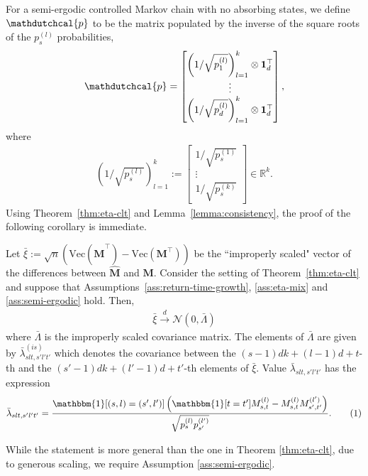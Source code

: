 \documentclass[twoside,11pt]{article}
\newcommand{\pow}[1]{^{(#1)}}%
\renewcommand{\Vec}[1]{\text{Vec}\lp #1\rp}
\numberwithin{equation}{section}
\newcommand{\lp}{\left(}
\newcommand{\rp}{\right)}
\newcommand{\Ncal}{\mathcal{N}}
\newcommand{\pcal}{\mathdutchcal{p}}
\newcommand\numberthis{\addtocounter{equation}{1}\tag{\theequation}}
\newcommand{\indicator}{\mathbbm{1}}
\begin{document}
For a semi-ergodic controlled Markov chain with no absorbing states, we define $\pcal$ to be the matrix populated by the inverse of the square roots of the $p_s\pow l$ probabilities, 
\begin{align*}
\pcal = 
\begin{bmatrix}
     \lp1/\sqrt{p_1\pow l}\rp_{l=1}^k \otimes \mathbf{1}_d^\top\\
     \vdots\\
    \lp1/\sqrt{p_d\pow l}\rp_{l=1}^k \otimes \mathbf{1}_d^\top 
\end{bmatrix}
, 
\end{align*}
where
\begin{align*}
     \lp1/\sqrt{p_s\pow l}\rp_{l=1}^k :=
\begin{bmatrix}
     1/\sqrt{p_s\pow 1}\\
     \vdots\\
    1/\sqrt{p_s\pow k}
\end{bmatrix} 
\in \mathbb R^k.
\end{align*}
Using Theorem~\ref{thm:eta-clt} and Lemma~\ref{lemma:consistency}, the proof of the following corollary is immediate.
\begin{corollary}\label{cor:improper-clt}
    Let $\bar \xi :=\sqrt{n}\lp\Vec{\mathbf{\hat M}^\top}-\Vec{\mathbf{M}^\top}\rp$ be the ``improperly scaled" vector of the differences between $\mathbf{\hat M}$ and $\mathbf{M}$. 
    Consider the setting of Theorem~\ref{thm:eta-clt} and suppose that Assumptions~\ref{ass:return-time-growth}, \ref{ass:eta-mix} and \ref{ass:semi-ergodic} hold. 
    Then,  
    \begin{align*}
    \bar \xi\overset{d}{\rightarrow}\Ncal(0,\bar{\Lambda})
    \end{align*}
    where $\bar{\Lambda}$ is the improperly scaled covariance matrix. The elements of $\bar{\Lambda}$ are given by $\bar{\lambda}_{slt,s'l't'}\pow{is}$ which denotes the covariance between the $(s-1)dk+(l-1)d+t$-th and the $(s'-1)dk+(l'-1)d+t'$-th elements of $\bar \xi$.
    Value $\bar{\lambda}_{slt,s'l't'}$ has the expression
    \begin{align*}
    \bar{\lambda}_{slt,s'l't'} =  \frac{\indicator[(s,l)=(s',l')]\lp \indicator[t=t'] M_{s,t}\pow l-M_{s,t}\pow l M_{s',t'}\pow {l'}\rp}{\sqrt{p_s\pow l p_{s'}\pow{l'}}}.\numberthis\label{eq:correlation-is} 
    \end{align*}
\end{corollary}
While the statement is more general than the one in Theorem \ref{thm:eta-clt}, due to generous scaling, we require Assumption \ref{ass:semi-ergodic}.
\end{document}
